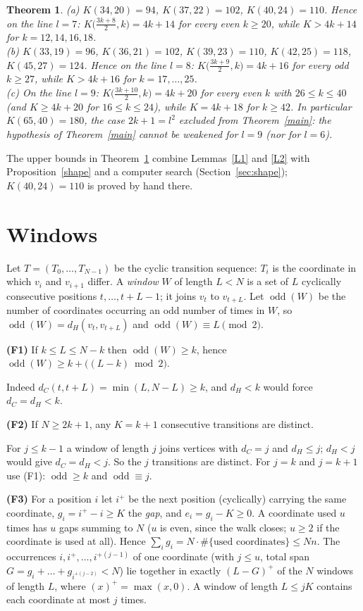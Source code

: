 \documentclass[11pt]{article}
\newtheorem{theorem}{Theorem}
\theoremstyle{remark}
\newcommand{\odd}{\operatorname{odd}}
\newcommand{\pos}[1]{(#1)^{+}}
\begin{document}
\begin{theorem}\label{l78}
(a) $K(34,20)=94$, $K(37,22)=102$, $K(40,24)=110$. Hence on the line $l=7$: $K\bigl(\tfrac{3k+8}{2},k\bigr)=4k+14$ for every even
$k\ge 20$, while $K>4k+14$ for $k=12,14,16,18$.\\
(b) $K(33,19)=96$, $K(36,21)=102$, $K(39,23)=110$, $K(42,25)=118$, $K(45,27)=124$. Hence on the line $l=8$:
$K\bigl(\tfrac{3k+9}{2},k\bigr)=4k+16$ for every odd $k\ge 27$, while $K>4k+16$ for $k=17,\dots,25$.\\
(c) On the line $l=9$: $K\bigl(\tfrac{3k+10}{2},k\bigr)=4k+20$ for every even $k$ with $26\le k\le 40$ (and $K\ge 4k+20$ for $16\le k\le 24$), while
$K=4k+18$ for $k\ge 42$. In particular $K(65,40)=180$, the case $2k+1=l^2$ excluded from Theorem~\ref{main}: the hypothesis of
Theorem~\ref{main} cannot be weakened for $l=9$ (nor for $l=6$).
\end{theorem}
The upper bounds in Theorem~\ref{l78} combine Lemmas~\ref{L1} and \ref{L2} with Proposition~\ref{shape} and a computer search
(Section~\ref{sec:shape}); $K(40,24)=110$ is proved by hand there.

\section{Windows}
Let $T=(T_0,\dots,T_{N-1})$ be the cyclic transition sequence: $T_i$ is the coordinate in which $v_i$ and $v_{i+1}$
differ. A \emph{window} $W$ of length $L<N$ is a set of $L$ cyclically consecutive positions $t,\dots,t+L-1$;
it joins $v_t$ to $v_{t+L}$. Let $\odd(W)$ be the number of coordinates occurring an odd number of times in $W$, so
$\odd(W)=d_H(v_t,v_{t+L})$ and $\odd(W)\equiv L \pmod 2$.

\medskip\noindent\textbf{(F1)} If $k\le L\le N-k$ then $\odd(W)\ge k$, hence $\odd(W)\ge k+\bigl((L-k)\bmod 2\bigr)$.

Indeed $d_C(t,t+L)=\min(L,N-L)\ge k$, and $d_H<k$ would force $d_C=d_H<k$.

\medskip\noindent\textbf{(F2)} If $N\ge 2k+1$, any $K=k+1$ consecutive transitions are distinct.

For $j\le k-1$ a window of length $j$ joins vertices with $d_C=j$ and $d_H\le j$; $d_H<j$ would give $d_C=d_H<j$.
So the $j$ transitions are distinct. For $j=k$ and $j=k+1$ use (F1): $\odd\ge k$ and $\odd\equiv j$.

\medskip\noindent\textbf{(F3)} For a position $i$ let $i^+$ be the next position (cyclically) carrying the same coordinate,
$g_i=i^+-i\ge K$ the \emph{gap}, and $e_i=g_i-K\ge 0$. A coordinate used $u$ times has $u$ gaps summing to $N$ ($u$ is even,
since the walk closes; $u\geq 2$ if the coordinate is used at all). Hence
$\sum_i g_i = N\cdot\#\{\text{used coordinates}\}\le Nn$. The occurrences $i,i^+,\dots,i^{+(j-1)}$ of one coordinate
(with $j\le u$, total span $G=g_i+\dots+g_{i^{+(j-2)}}<N$) lie together in exactly $\pos{L-G}$ of the $N$ windows of length $L$,
where $\pos{x}=\max(x,0)$. A window of length $L\le jK$ contains each coordinate at most $j$ times.
\end{document}
